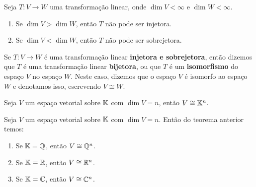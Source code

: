 \documentclass{beamer}
\begin{document}
\begin{frame}
    \begin{observacoes}
        Seja $T \colon V \to W$ uma transformação linear, \pause onde $\dim V < \infty$ e $\dim W < \infty$.\pause
        \begin{enumerate}[label={\roman*})]
            \item Se $\dim V > \dim W$, \pause então $T$ não pode ser injetora.\pause

            \vspace{.5cm}

            \item Se $\dim V < \dim W$, \pause então $T$ não pode ser sobrejetora.
        \end{enumerate}
    \end{observacoes}
\end{frame}

\begin{frame}
    \begin{definicao}
        Se $T \colon V \to W$ é uma transformação linear \pause \textbf{injetora e sobrejetora}, \pause então dizemos que $T$ é uma transformação linear \textbf{bijetora}, \pause ou que $T$ é um \textbf{isomorfismo} \pause do espaço $V$ no espaço $W$. \pause Neste caso, dizemos que o espaço $V$ é isomorfo ao espaço $W$ \pause e denotamos isso, escrevendo $V \cong W$.\pause
    \end{definicao}

    \begin{teorema}
        Seja $V$ um espaço vetorial sobre $\mathbb{K}$ \pause com $\dim V = n$, \pause então $V \cong \mathbb{K}^n$.
    \end{teorema}
\end{frame}

\begin{frame}
    \begin{observacoes}
        Seja $V$ um espaço vetorial sobre $\mathbb{K}$ \pause com $\dim V = n$. \pause Então do teorema anterior temos:\pause
        \begin{enumerate}[label={\roman*})]
            \item Se $\mathbb{K} = \mathbb{Q}$, \pause então $V \cong \mathbb{Q}^n$.\pause

            \vspace{.5cm}

            \item Se $\mathbb{K} = \mathbb{R}$, \pause então $V \cong \mathbb{R}^n$.\pause

            \vspace{.5cm}
            
            \item Se $\mathbb{K} = \mathbb{C}$, \pause então $V \cong \mathbb{C}^n$.
        \end{enumerate}
    \end{observacoes}
\end{frame}
\end{document}
